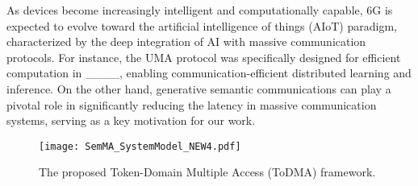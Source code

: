 As devices become increasingly intelligent and computationally capable, 6G is expected to evolve toward the artificial intelligence of things (AIoT) paradigm, characterized by the deep integration of AI with massive communication protocols. For instance, the UMA protocol was specifically designed for efficient computation in ____, enabling communication-efficient distributed learning and inference. On the other hand, generative semantic communications can play a pivotal role in significantly reducing the latency in massive communication systems, serving as a key motivation for our work.

\begin{figure*}[t]
     \centering
     \texttt{[image: SemMA\_SystemModel\_NEW4.pdf]}
     \caption{The proposed Token-Domain Multiple Access (ToDMA) framework.}
     \label{fig2}
     \vspace{-5mm}
\end{figure*}